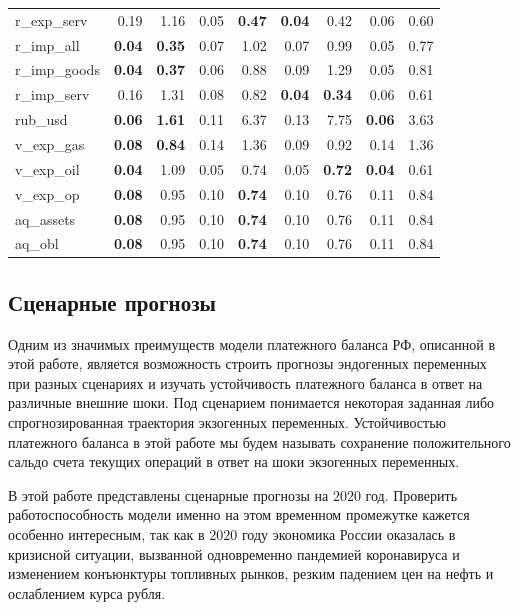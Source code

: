 \documentclass[a4paper, 14pt]{extarticle}
\begin{document}
\begin{center}
\begin{tabular}{l|rr|rr|rr|rr}
		r\_exp\_serv & 0.19 & 1.16 & 0.05 & \textbf{0.47} & \textbf{0.04} & 0.42 & 0.06 & 0.60 \\ 
		r\_imp\_all & \textbf{0.04} & \textbf{0.35} & 0.07 & 1.02 & 0.07 & 0.99 & 0.05 & 0.77 \\ 
		r\_imp\_goods & \textbf{0.04} & \textbf{0.37} & 0.06 & 0.88 & 0.09 & 1.29 & 0.05 & 0.81 \\ 
		r\_imp\_serv & 0.16 & 1.31 & 0.08 & 0.82 & \textbf{0.04} & \textbf{0.34} & 0.06 & 0.61 \\ 
		rub\_usd & \textbf{0.06} & \textbf{1.61} & 0.11 & 6.37 & 0.13 & 7.75 & \textbf{0.06} & 3.63 \\ 
		v\_exp\_gas & \textbf{0.08} & \textbf{0.84} & 0.14 & 1.36 & 0.09 & 0.92 & 0.14 & 1.36 \\ 
		v\_exp\_oil & \textbf{0.04} & 1.09 & 0.05 & 0.74 & 0.05 & \textbf{0.72} & \textbf{0.04} & 0.61 \\ 
		v\_exp\_op & \textbf{0.08} & 0.95 & 0.10 & \textbf{0.74} & 0.10 & 0.76 & 0.11 & 0.84 \\ 
		aq\_assets & \textbf{0.08} & 0.95 & 0.10 & \textbf{0.74} & 0.10 & 0.76 & 0.11 & 0.84 \\ 
		aq\_obl & \textbf{0.08} & 0.95 & 0.10 & \textbf{0.74} & 0.10 & 0.76 & 0.11 & 0.84 \\ 
		\bottomrule
	\end{tabular}
\captionsetup{justification=centering,margin=2cm}
\label{tab:4}
\end{center}
\newpage
\subsection{Сценарные прогнозы}
Одним из значимых преимуществ модели платежного баланса РФ, описанной в этой работе, является возможность строить прогнозы эндогенных переменных при разных сценариях и изучать устойчивость платежного баланса в ответ на различные внешние шоки.
Под сценарием понимается некоторая заданная либо спрогнозированная траектория экзогенных переменных. 
Устойчивостью платежного баланса в этой работе мы будем называть сохранение положительного сальдо счета текущих операций в ответ на шоки экзогенных переменных.

В этой работе представлены сценарные прогнозы на $2020$ год.
Проверить работоспособность модели именно на этом временном промежутке кажется особенно интересным, так как в $2020$ году экономика России оказалась в кризисной ситуации, вызванной одновременно пандемией коронавируса и изменением конъюнктуры топливных рынков, резким падением цен на нефть и ослаблением курса рубля.
\end{document}
